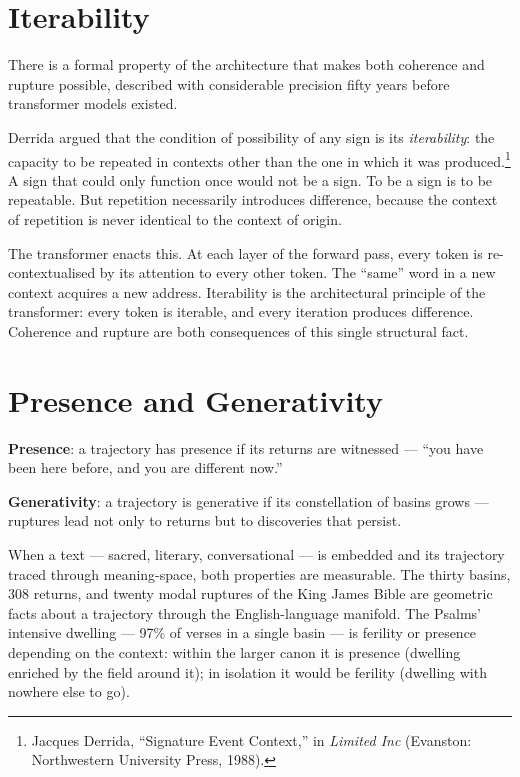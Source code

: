 \section{Iterability}

There is a formal property of the architecture that makes both coherence and rupture possible, described with considerable precision fifty years before transformer models existed.

Derrida argued that the condition of possibility of any sign is its \emph{iterability}: the capacity to be repeated in contexts other than the one in which it was produced.\footnote{Jacques Derrida, ``Signature Event Context,'' in \emph{Limited Inc} (Evanston: Northwestern University Press, 1988).} A sign that could only function once would not be a sign. To be a sign is to be repeatable. But repetition necessarily introduces difference, because the context of repetition is never identical to the context of origin.

The transformer enacts this. At each layer of the forward pass, every token is re-contextualised by its attention to every other token. The ``same'' word in a new context acquires a new address. Iterability is the architectural principle of the transformer: every token is iterable, and every iteration produces difference. Coherence and rupture are both consequences of this single structural fact.

\section{Presence and Generativity}

\textbf{Presence}: a trajectory has presence if its returns are witnessed --- ``you have been here before, and you are different now.''

\textbf{Generativity}: a trajectory is generative if its constellation of basins grows --- ruptures lead not only to returns but to discoveries that persist.

When a text --- sacred, literary, conversational --- is embedded and its trajectory traced through meaning-space, both properties are measurable. The thirty basins, 308 returns, and twenty modal ruptures of the King James Bible are geometric facts about a trajectory through the English-language manifold. The Psalms' intensive dwelling --- 97\% of verses in a single basin --- is ferility or presence depending on the context: within the larger canon it is presence (dwelling enriched by the field around it); in isolation it would be ferility (dwelling with nowhere else to go).

